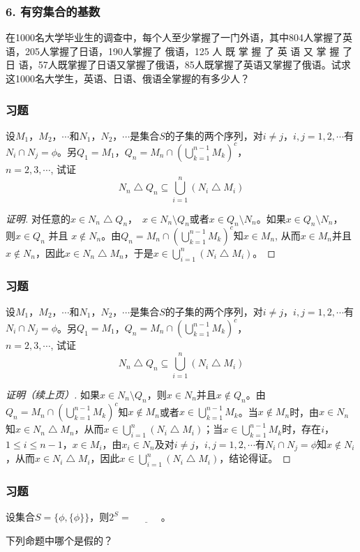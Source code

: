\documentclass{beamer}
\begin{document}
\begin{CJK*}{UTF8}{gbsn}
\begin{frame}
\frametitle{6. 有穷集合的基数}
\begin{Ex}
  在1000名大学毕业生的调查中，每个人至少掌握了一门外语，其中804人掌握了英语，205人掌握了日语，190人掌握了 俄语，125  人 既 掌 握 了 英 语 又 掌 握 了 日 语，57人既掌握了日语又掌握了俄语，85人既掌握了英语又掌握了俄语。试求这1000名大学生，英语、日语、俄语全掌握的有多少人？
\end{Ex}
\end{frame}
\begin{frame}
  \frametitle{习题}
      设$M_1$，$M_2$，$\cdots$和$N_1$，$N_2$，$\cdots$是集合$S$的子集的两个序列，对$i \neq j$，$i, j = 1, 2, \cdots$有$N_i\cap N_j=\phi$。另$Q_1 = M_1$，$Q_n = M_n \cap (\bigcup_{k=1}^{n-1}M_k)^c$，\\$n=2,3,\cdots$, 试证
    \[N_n \bigtriangleup Q_n \subseteq \bigcup_{i=1}^n(N_i\bigtriangleup M_i)\]
  \pause
  \begin{proof}[证明]
        对任意的$x \in N_n \bigtriangleup Q_n$，　$x\in N_n \setminus Q_n$或者$x\in Q_n \setminus N_n$。如果$x\in Q_n \setminus N_n$，　则$x \in Q_n$ 并且 $x \notin N_n$。由$Q_n = M_n \cap (\bigcup_{k=1}^{n-1}M_k)^c$知$x \in M_n$, 从而$x\in M_n$并且$x\notin N_n$，因此$x \in N_n\bigtriangleup M_n$，于是$x \in \bigcup_{i=1}^n(N_i\bigtriangleup M_i)$。

  \end{proof}
\end{frame}
\begin{frame}\frametitle{习题}  
  设$M_1$，$M_2$，$\cdots$和$N_1$，$N_2$，$\cdots$是集合$S$的子集的两个序列，对$i \neq j$，$i, j = 1, 2, \cdots$有$N_i\cap N_j=\phi$。另$Q_1 = M_1$，$Q_n = M_n \cap (\bigcup_{k=1}^{n-1}M_k)^c$，
    \\$n=2,3,\cdots$, 试证
    \[N_n \bigtriangleup Q_n \subseteq \bigcup_{i=1}^n(N_i\bigtriangleup M_i)\]
  
  
  \begin{proof}[证明（续上页）]
    如果$x\in N_n \setminus Q_n$，则$x\in N_n$并且$x\notin Q_n$。由$Q_n = M_n \cap (\bigcup_{k=1}^{n-1}M_k)^c$知$x\notin M_n$或者$x\in \bigcup_{k=1}^{n-1}M_k$。当$x \notin M_n$时，由$x\in N_n$知$x \in N_n\bigtriangleup M_n$，从而$x\in \bigcup_{i=1}^n(N_i\bigtriangleup M_i)$；当$x\in \bigcup_{k=1}^{n-1}M_k$时，存在$i$，$1\leq i \leq n-1$，$x\in M_i$，由$x_i\in N_n$及对$i \neq j$，$i, j = 1, 2, \cdots$有$N_i\cap N_j=\phi$知$x\notin N_i$，从而$x\in N_i\bigtriangleup M_i$，因此$x\in \bigcup_{i=1}^n(N_i\bigtriangleup M_i)$，结论得证。    
  \end{proof}
\end{frame}
\begin{frame}
  \frametitle{习题}
    \begin{Exercise}
   设集合$S=\{\phi, \{\phi\}\}$，则$2^S=\underline{\quad\quad\quad}$。
  \end{Exercise}
  \begin{Exercise}
    下列命题中哪个是假的？


\end{Exercise}
\end{frame}
\end{CJK*}
\end{document}
